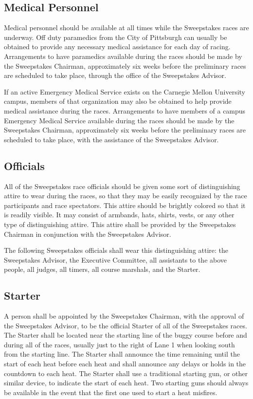 \subsection{Medical Personnel}

	Medical personnel should be available at all times while the Sweepstakes races
	are underway. Off duty paramedics from the City of Pittsburgh can usually be
	obtained to provide any necessary medical assistance for each day of racing.
	Arrangements to have paramedics available during the races should be made by
	the Sweepstakes Chairman, approximately six weeks before the preliminary races
	are scheduled to take place, through the office of the Sweepstakes Advisor.

	If an active Emergency Medical Service exists on the Carnegie Mellon University
	campus, members of that organization may also be obtained to help provide
	medical assistance during the races. Arrangements to have members of a campus
	Emergency Medical Service available during the races should be made by the
	Sweepstakes Chairman, approximately six weeks before the preliminary races are
	scheduled to take place, with the assistance of the Sweepstakes Advisor.

\subsection{Officials}

	All of the Sweepstakes race officials should be given some sort of
	distinguishing attire to wear during the races, so that they may be easily
	recognized by the race participants and race spectators. This attire should be
	brightly colored so that it is readily visible. It may consist of armbands,
	hats, shirts, vests, or any other type of distinguishing attire. This attire
	shall be provided by the Sweepstakes Chairman in conjunction with the
	Sweepstakes Advisor.

	The following Sweepstakes officials shall wear this distinguishing attire: the
	Sweepstakes Advisor, the Executive Committee, all assistants to the above people, 
	all judges, all timers, all course marshals, and the Starter.

\subsection{Starter}

	A person shall be appointed by the Sweepstakes Chairman, with the approval of
	the Sweepstakes Advisor, to be the official Starter of all of the Sweepstakes
	races. The Starter shall be located near the starting line of the buggy course
	before and during all of the races, usually just to the right of Lane 1 when
	looking south from the starting line. The Starter shall announce the time
	remaining until the start of each heat before each heat and shall announce any
	delays or holds in the countdown to each heat. The Starter shall use a
	traditional starting gun, or other similar device, to indicate the start of
	each heat. Two starting guns should always be available in the event that the
	first one used to start a heat misfires.

